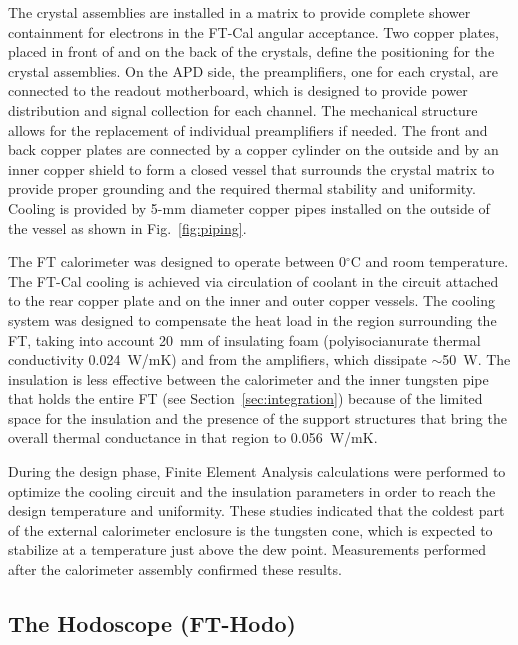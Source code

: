 The crystal assemblies are installed in a matrix to provide complete shower containment for electrons in the FT-Cal
angular acceptance. Two copper plates, placed in front of and on the back of the crystals, define the positioning for
the crystal assemblies. On the APD side, the preamplifiers, one for each crystal, are connected to the readout
motherboard, which is designed to provide power distribution and signal collection for each channel. The mechanical
structure allows for the replacement of individual preamplifiers if needed. The front and back copper plates are
connected by a copper cylinder on the outside and by an inner copper shield to form a closed vessel that surrounds
the crystal matrix to provide proper grounding and the required thermal stability and uniformity. Cooling is provided
by 5-mm diameter copper pipes installed on the outside of the vessel as shown in Fig.~\ref{fig:piping}. 

The FT calorimeter was designed to operate between 0$^\circ$C and room temperature. The FT-Cal cooling is
achieved via circulation of coolant in the circuit attached to the rear copper plate and on the inner and outer copper
vessels. The cooling system was designed to compensate the heat load in the region surrounding the FT, taking into
account 20~mm of insulating foam (polyisocianurate thermal conductivity 0.024~W/mK) and from the amplifiers, which
dissipate $\sim$50~W. The insulation is less effective between the calorimeter and the inner tungsten pipe that
holds the entire FT (see Section~\ref{sec:integration}) because of the limited space for the insulation and the
presence of the support structures that bring the overall thermal conductance in that region to 0.056~W/mK.

During the design phase, Finite Element Analysis calculations were performed to optimize the cooling circuit and the
insulation parameters in order to reach the design temperature and uniformity. These studies indicated that the
coldest part of the external calorimeter enclosure is the tungsten cone, which is expected to stabilize at a
temperature just above the dew point. Measurements performed after the calorimeter assembly confirmed these
results.

\subsection{The Hodoscope (FT-Hodo)}

